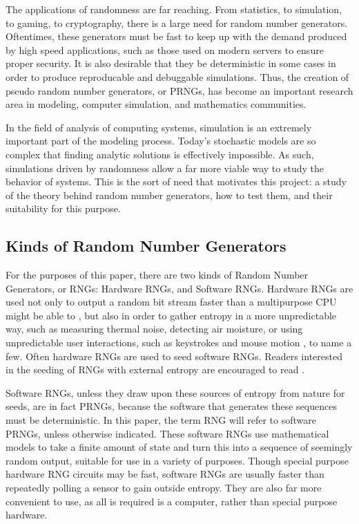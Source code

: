 The applications of randomness are far reaching. From statistics, to simulation, to gaming, to cryptography, there is a large need for random number generators. Oftentimes, these generators must be fast to keep up with the demand produced by high speed applications, such as those used on modern servers to ensure proper security. It is also desirable that they be deterministic in some cases in order to produce reproducable and debuggable simulations. Thus, the creation of pseudo random number generators, or PRNGs, has become an important research area in modeling, computer simulation, and mathematics communities.

In the field of analysis of computing systems, simulation is an extremely important part of the modeling process. Today's stochastic models are so complex that finding analytic solutions is effectively impossible. As such, simulations driven by randomness allow a far more viable way to study the behavior of systems. This is the sort of need that motivates this project: a study of the theory behind random number generators, how to test them, and their suitability for this purpose.

\subsection{Kinds of Random Number Generators}
For the purposes of this paper, there are two kinds of Random Number Generators, or RNGs: Hardware RNGs, and Software RNGs. Hardware RNGs are used not only to output a random bit stream faster than a multipurpose CPU might be able to \cite{Saiprasert:2010:OHA:1857927.1857929,Barel:1983:FHR:800042.801454}, but also in order to gather entropy in a more unpredictable way, such as measuring thermal noise, detecting air moisture, or using unpredictable user interactions, such as keystrokes and mouse motion , to name a few. Often hardware RNGs are used to seed software RNGs. Readers interested in the seeding of RNGs with external entropy are encouraged to read \cite{Hennebert:2013:EHP:2462096.2462122}.

Software RNGs, unless they draw upon these sources of entropy from nature for seeds, are in fact PRNGs, because the software that generates these sequences must be deterministic. In this paper, the term RNG will refer to software PRNGs, unless otherwise indicated. These software RNGs use mathematical models to take a finite amount of state and turn this into a sequence of seemingly random output, suitable for use in a variety of purposes. Though special purpose hardware RNG circuits may be fast, software RNGs are usually faster than repeatedly polling a sensor to gain outside entropy. They are also far more convenient to use, as all is required is a computer, rather than special purpose hardware.

